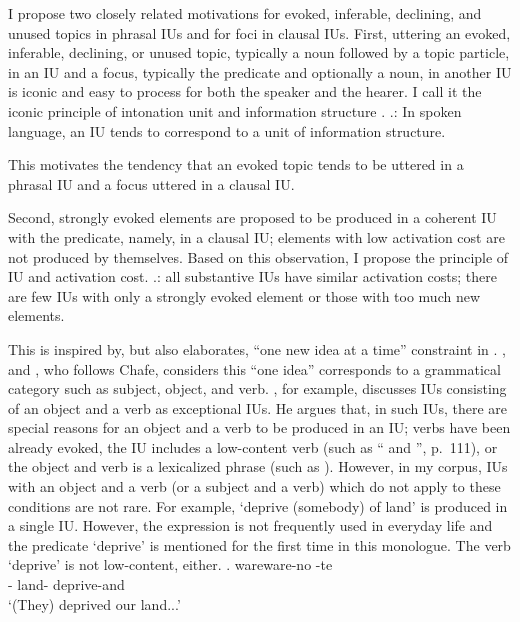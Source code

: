 I propose two closely related motivations for evoked, inferable, declining, and unused topics in phrasal IUs and for foci in clausal IUs.
First,
uttering an evoked, inferable, declining, or unused topic, typically a noun followed by a topic particle, in an IU and
a focus, typically the predicate and optionally a noun, in another IU
is iconic and easy to process for both the speaker and the hearer.
I call it the iconic principle of intonation unit and information structure \Next.
%
\ex.\label{IUIconicP}:
	In spoken language,
	an IU tends to correspond to a unit of information structure.

This motivates the tendency that
an evoked topic tends to be uttered in a phrasal IU and
a focus uttered in a clausal IU.

Second,
strongly evoked elements are proposed to be produced in a coherent IU with the predicate,
namely, in a clausal IU;
elements with low activation cost are not produced by themselves.
Based on this observation,
I propose the principle of IU and activation cost.
%
\ex.\label{IUActCostP}:
     all substantive IUs have similar activation costs;
     there are few IUs with only a strongly evoked element or
     those with too much new elements.

This is inspired by, but also elaborates, ``one new idea at a time'' constraint in .
, and , who follows Chafe,
considers this ``one idea'' corresponds to a grammatical category such as subject, object, and verb.
, for example, discusses IUs consisting of an object and a verb as exceptional IUs.
He argues that,
in such IUs,
there are special reasons for an object and a verb to be produced in an IU;
verbs have been already evoked,
the IU includes a low-content verb (such as `` and '', p.~111), or
the object and verb is a lexicalized phrase (such as ).
However, in my corpus,
IUs with an object and a verb (or a subject and a verb) which do not apply
to these conditions are not rare.
For example,
 `deprive (somebody) of land'
is produced in a single IU.
However, the expression is not frequently used in everyday life
and the predicate  `deprive' is mentioned for the first time in this monologue.
The verb  `deprive' is not low-content, either.
%
\exg. wareware-no {\iub}  -te {\iub} \\
      - {} land- deprive-and {} \\
      `(They) deprived our land...'

